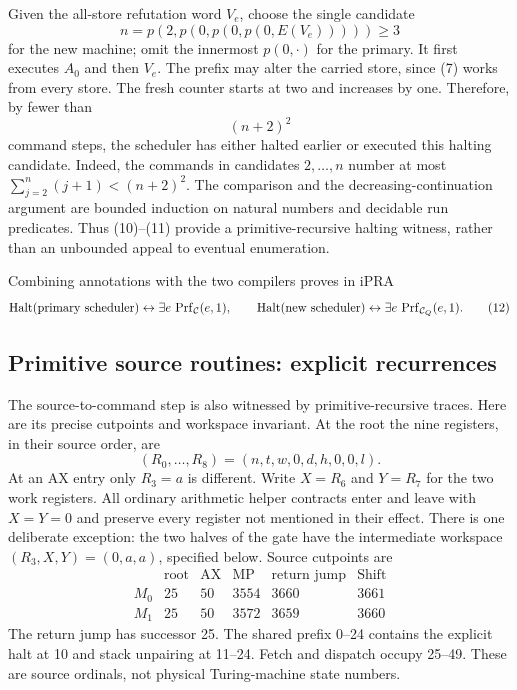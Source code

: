 Given the all-store refutation word $V_e$, choose the single candidate
\[
 n=p(2,p(0,p(0,p(0,E(V_e)))))\geq3                        \tag{10}
\]
for the new machine; omit the innermost $p(0,\cdot)$ for the primary.
It first executes $A_0$ and then $V_e$.  The prefix may alter the
carried store, since (7) works from every store.  The fresh counter
starts at two and increases by one.  Therefore, by fewer than
\[
                  (n+2)^2                               \tag{11}
\]
command steps, the scheduler has either halted earlier or executed
this halting candidate.  Indeed, the commands in candidates
$2,\ldots,n$ number at most $\sum_{j=2}^n(j+1)<(n+2)^2$.
The comparison and the decreasing-continuation argument are bounded
induction on natural numbers and decidable run predicates.  Thus
(10)--(11) provide a primitive-recursive halting witness, rather
than an unbounded appeal to eventual enumeration.

Combining annotations with the two compilers proves in iPRA
\[
 \operatorname{Halt}(\text{primary scheduler})\leftrightarrow
        \exists e\,\operatorname{Prf}_{\mathcal C}(e,1),
 \qquad
 \operatorname{Halt}(\text{new scheduler})\leftrightarrow
        \exists e\,\operatorname{Prf}_{\mathcal C_Q}(e,1).   \tag{12}
\]

\subsection{Primitive source routines: explicit recurrences}

The source-to-command step is also witnessed by primitive-recursive
traces.  Here are its precise cutpoints and workspace invariant.
At the root the nine registers, in their source order, are
\[
       (R_0,\ldots,R_8)=(n,t,w,0,d,h,0,0,l).
\]
At an AX entry only $R_3=a$ is different.  Write $X=R_6$ and
$Y=R_7$ for the two work registers.  All ordinary arithmetic helper
contracts enter and leave with $X=Y=0$ and preserve every register
not mentioned in their effect.  There is one deliberate exception:
the two halves of the gate have the intermediate workspace
$(R_3,X,Y)=(0,a,a)$, specified below.  Source cutpoints are
\[
\begin{array}{c|rrrrr}
 &\text{root}&\text{AX}&\text{MP}&\text{return jump}&\text{Shift}\\ \hline
 M_0&25&50&3554&3660&3661\\
 M_1&25&50&3572&3659&3660
\end{array}
\]
The return jump has successor 25.  The shared prefix 0--24 contains
the explicit halt at 10 and stack unpairing at 11--24.  Fetch and
dispatch occupy 25--49.  These are source ordinals, not physical
Turing-machine state numbers.

